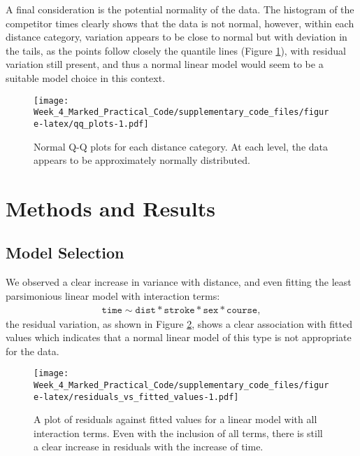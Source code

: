 \documentclass[a4paper,11pt]{article}
\begin{document}
A final consideration is the potential normality of the data. The histogram of the competitor times clearly shows that the data is not normal, however, within each distance category, variation appears to be close to normal but with deviation in the tails, as the points follow closely the quantile lines (Figure \ref{qq}), with residual variation still present, and thus a normal linear model would seem to be a suitable model choice in this context.

\begin{figure}
  \centering
  \texttt{[image: Week\_4\_Marked\_Practical\_Code/supplementary\_code\_files/figure-latex/qq\_plots-1.pdf]}
  \caption{Normal Q-Q plots for each distance category. At each level, the data appears to be approximately normally distributed.}
  \label{qq}
\end{figure}

\section{Methods and Results}

\subsection{Model Selection}

We observed a clear increase in variance with distance, and even fitting the least parsimonious linear model with interaction terms:
\begin{align}
  \texttt{time} \sim \texttt{dist}*\texttt{stroke}*\texttt{sex}*\texttt{course}, \label{naive_linear_model}
\end{align}
the residual variation, as shown in Figure \ref{residuals_vs_fitted_values_linear_model1}, shows a clear association with fitted values which indicates that a normal linear model of this type is not appropriate for the data.

\begin{figure}
  \centering
  \texttt{[image: Week\_4\_Marked\_Practical\_Code/supplementary\_code\_files/figure-latex/residuals\_vs\_fitted\_values-1.pdf]}
  \caption{A plot of residuals against fitted values for a linear model with all interaction terms. Even with the inclusion of all terms, there is still a clear increase in residuals with the increase of time.}
  \label{residuals_vs_fitted_values_linear_model1}
\end{figure}
\end{document}
